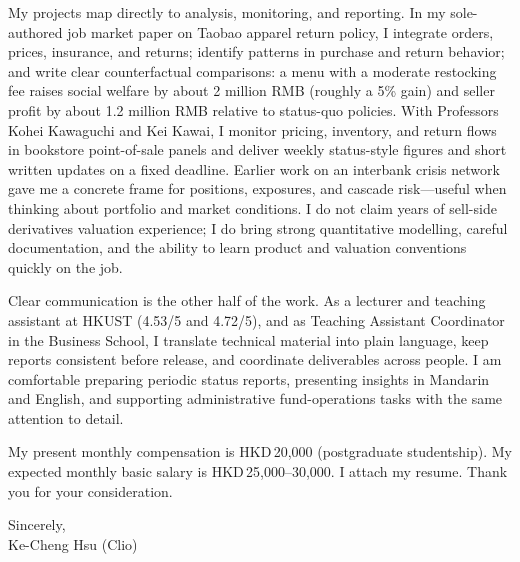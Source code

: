 \documentclass[11pt,letterpaper]{article}
\begin{document}
My projects map directly to analysis, monitoring, and reporting. In my sole-authored job market paper on Taobao apparel return policy, I integrate orders, prices, insurance, and returns; identify patterns in purchase and return behavior; and write clear counterfactual comparisons: a menu with a moderate restocking fee raises social welfare by about 2 million RMB (roughly a 5\% gain) and seller profit by about 1.2 million RMB relative to status-quo policies. With Professors Kohei Kawaguchi and Kei Kawai, I monitor pricing, inventory, and return flows in bookstore point-of-sale panels and deliver weekly status-style figures and short written updates on a fixed deadline. Earlier work on an interbank crisis network gave me a concrete frame for positions, exposures, and cascade risk---useful when thinking about portfolio and market conditions. I do not claim years of sell-side derivatives valuation experience; I do bring strong quantitative modelling, careful documentation, and the ability to learn product and valuation conventions quickly on the job.

Clear communication is the other half of the work. As a lecturer and teaching assistant at HKUST (4.53/5 and 4.72/5), and as Teaching Assistant Coordinator in the Business School, I translate technical material into plain language, keep reports consistent before release, and coordinate deliverables across people. I am comfortable preparing periodic status reports, presenting insights in Mandarin and English, and supporting administrative fund-operations tasks with the same attention to detail.

My present monthly compensation is HKD\,20,000 (postgraduate studentship). My expected monthly basic salary is HKD\,25,000--30,000. I attach my resume. Thank you for your consideration.

\vspace{0.4em}
Sincerely,\\[0.35em]
Ke-Cheng Hsu (Clio)
\end{document}
